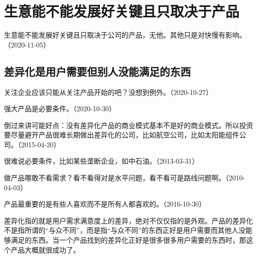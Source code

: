 
\section{生意能不能发展好关键且只取决于产品}

生意能不能发展好关键且只取决于公司的产品，无他。其他只是对快慢有影响。（2020-11-05）

\subsection{差异化是用户需要但别人没能满足的东西}


关注企业应该只能从关注产品开始的吧？没想到例外。（2020-10-27）


强大产品是必要条件。（2020-10-30）


倒过来讲可能好点：没有差异化产品的商业模式基本不是好的商业模式。所以投资要尽量避开产品很难长期做出差异化的公司，比如航空公司，比如太阳能组件公司。（2015-04-20）


很难说必要条件，比如某些垄断企业，如中石油。（2013-03-31）


做产品哪敢不看需求？看不看得对是水平问题，看不看可是路线问题啊。（2010-04-03）


产品最重要的是有些人喜欢而不是所有人都喜欢的。（2016-10-30）


差异化指的就是用户需求满意度上的差异，绝对不仅仅指的是外观。产品的差异化不是指所谓的“与众不同”，而是指“与众不同”的东西正好是用户需要而其他人没能够满足的东西。当一个产品找到的差异化正好是很多很多用户需要的东西时，那这个产品大概就很成功了。

